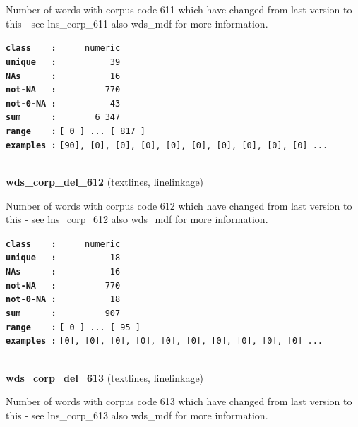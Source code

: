 \documentclass[]{article}
\begin{document}
Number of words with corpus code 611 which have changed from last
version to this - see lns\_corp\_611 also wds\_mdf for more information.

\textbf{\texttt{class\ \ \ \ :}} \texttt{~~~~~numeric}\\
\textbf{\texttt{unique\ \ \ :}} \texttt{~~~~~~~~~~39}\\
\textbf{\texttt{NAs\ \ \ \ \ \ :}} \texttt{~~~~~~~~~~16}\\
\textbf{\texttt{not-NA\ \ \ :}} \texttt{~~~~~~~~~770}\\
\textbf{\texttt{not-0-NA\ :}} \texttt{~~~~~~~~~~43}\\
\textbf{\texttt{sum\ \ \ \ \ \ :}} \texttt{~~~~~~~6~347}\\
\textbf{\texttt{range\ \ \ \ :}}
\texttt{{[}\ 0\ {]}\ ...\ {[}\ 817\ {]}}\\
\textbf{\texttt{examples\ :}}
\texttt{{[}90{]},\ {[}0{]},\ {[}0{]},\ {[}0{]},\ {[}0{]},\ {[}0{]},\ {[}0{]},\ {[}0{]},\ {[}0{]},\ {[}0{]}\ ...}\\

~

\textbf{wds\_corp\_del\_612} (textlines, linelinkage)

Number of words with corpus code 612 which have changed from last
version to this - see lns\_corp\_612 also wds\_mdf for more information.

\textbf{\texttt{class\ \ \ \ :}} \texttt{~~~~~numeric}\\
\textbf{\texttt{unique\ \ \ :}} \texttt{~~~~~~~~~~18}\\
\textbf{\texttt{NAs\ \ \ \ \ \ :}} \texttt{~~~~~~~~~~16}\\
\textbf{\texttt{not-NA\ \ \ :}} \texttt{~~~~~~~~~770}\\
\textbf{\texttt{not-0-NA\ :}} \texttt{~~~~~~~~~~18}\\
\textbf{\texttt{sum\ \ \ \ \ \ :}} \texttt{~~~~~~~~~907}\\
\textbf{\texttt{range\ \ \ \ :}}
\texttt{{[}\ 0\ {]}\ ...\ {[}\ 95\ {]}}\\
\textbf{\texttt{examples\ :}}
\texttt{{[}0{]},\ {[}0{]},\ {[}0{]},\ {[}0{]},\ {[}0{]},\ {[}0{]},\ {[}0{]},\ {[}0{]},\ {[}0{]},\ {[}0{]}\ ...}\\

~

\textbf{wds\_corp\_del\_613} (textlines, linelinkage)

Number of words with corpus code 613 which have changed from last
version to this - see lns\_corp\_613 also wds\_mdf for more information.
\end{document}
